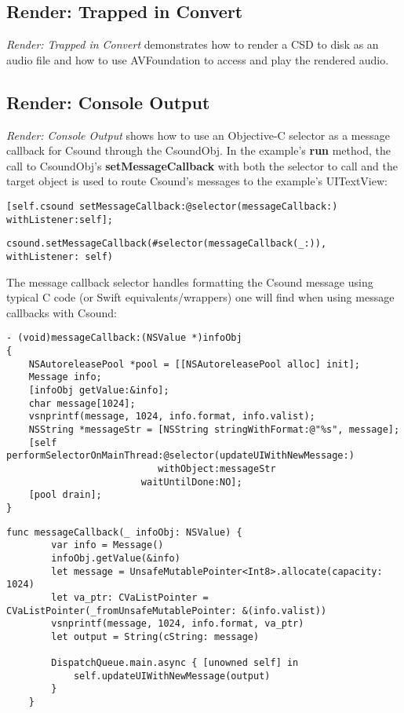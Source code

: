 \documentclass[11pt]{article}
\begin{document}
\subsection{Render: Trapped in Convert}

\emph{Render: Trapped in Convert} demonstrates how to render a CSD to disk as an audio file and how to use AVFoundation to access and play the rendered audio.   

\subsection{Render: Console Output}

\emph{Render: Console Output} shows how to use an Objective-C selector as a message callback for Csound through the CsoundObj.  In the example's \textbf{run} method, the call to CsoundObj's \textbf{setMessageCallback} with both the selector to call and the target object is used to route Csound's messages to the example's UITextView:

\begin{lstlisting}[caption=Example of setting message callback]
    [self.csound setMessageCallback:@selector(messageCallback:) withListener:self];
\end{lstlisting}

\begin{lstlisting}[caption=Equivalent example in Swift 3]
csound.setMessageCallback(#selector(messageCallback(_:)), withListener: self)
\end{lstlisting}

The message callback selector handles formatting the Csound message using typical C code (or Swift equivalents/wrappers) one will find when using message callbacks with Csound:

\begin{lstlisting}[caption=Message Callback Selector Code]
- (void)messageCallback:(NSValue *)infoObj
{
    NSAutoreleasePool *pool = [[NSAutoreleasePool alloc] init];
    Message info;
    [infoObj getValue:&info];
    char message[1024];
    vsnprintf(message, 1024, info.format, info.valist);
    NSString *messageStr = [NSString stringWithFormat:@"%s", message];
    [self performSelectorOnMainThread:@selector(updateUIWithNewMessage:)
                           withObject:messageStr
                        waitUntilDone:NO];
    [pool drain];
}
\end{lstlisting}

\begin{lstlisting}[caption=Message Callback Selector Code in Swift 3]
    func messageCallback(_ infoObj: NSValue) {
        var info = Message()
        infoObj.getValue(&info)
        let message = UnsafeMutablePointer<Int8>.allocate(capacity: 1024)
        let va_ptr: CVaListPointer = CVaListPointer(_fromUnsafeMutablePointer: &(info.valist))
        vsnprintf(message, 1024, info.format, va_ptr)
        let output = String(cString: message)
        
        DispatchQueue.main.async { [unowned self] in
            self.updateUIWithNewMessage(output)
        }
    }
\end{lstlisting}
\end{document}
